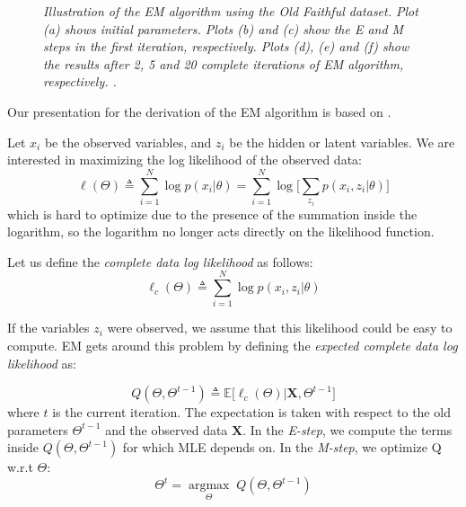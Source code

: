 \begin{figure}[ht!]
\begin{center}
{        }
    \end{center}
    \caption{\emph{Illustration of the EM algorithm using the Old Faithful dataset. Plot (a) shows initial parameters. Plots (b) and (c) show the E and M steps in the first iteration, respectively. Plots (d), (e) and (f) show the results after 2, 5 and 20 complete iterations of EM algorithm, respectively. \cite[Ch. \ 9]{Bishop2006}.}}
   \label{em-algorithm-pic}
\end{figure}

Our presentation for the derivation of the EM algorithm is based on \cite[Ch. \ 11]{Murphy2012}.

Let $x_{i}$ be the observed variables, and $z_{i}$ be the hidden or latent variables. We are interested in maximizing the log likelihood of the observed data:
\begin{equation} \label{log-lik-observed-f-mm}
	\ell(\Theta) \triangleq \sum_{i=1}^{N} \log p(x_{i}|\theta) =  \sum_{i=1}^{N} \log \bigg[\sum_{z_{i}} p(x_{i}, z_{i}|\theta) \bigg]
\end{equation}
which is hard to optimize due to the presence of the summation inside the logarithm, so the logarithm no longer acts directly on the likelihood function.

Let us define the \emph{complete data log likelihood} as follows:
\begin{equation} \label{log-lik-comp-observed-f-mm}
	\ell_{c}(\Theta) \triangleq \sum_{i=1}^{N} \log p(x_{i}, z_{i}|\theta)
\end{equation}

If the variables $z_{i}$ were observed, we assume that this likelihood could be easy to compute. EM gets around this problem by defining the \emph{expected complete data log likelihood} as:

\begin{equation} \label{log-lik-expected-f-mm}
		Q(\Theta, \Theta^{t-1}) \triangleq \mathbb{E} \big[\ell_{c}(\Theta) | \mathbf{X}, \Theta^{t-1}\big]
\end{equation}
where $t$ is the current iteration. The expectation is taken with respect to the old parameters $\Theta^{t-1}$ and the observed data $\mathbf{X}$. In the \emph{E-step}, we compute the terms inside $Q(\Theta, \Theta^{t-1})$ for which MLE depends on. In the \emph{M-step}, we optimize Q w.r.t $\Theta$:
\begin{equation} \label{max-log-lik-observed-f-mm}
	\Theta^{t} = \underset{\Theta}{\operatorname{argmax}} \; Q(\Theta, \Theta^{t-1})
\end{equation}

